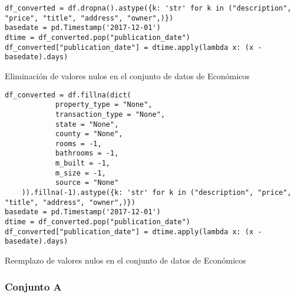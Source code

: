 \begin{listing}[H]
    \begin{verbatim}
df_converted = df.dropna().astype({k: 'str' for k in ("description", "price", "title", "address", "owner",)})
basedate = pd.Timestamp('2017-12-01')
dtime = df_converted.pop("publication_date")
df_converted["publication_date"] = dtime.apply(lambda x: (x - basedate).days)
    \end{verbatim}
\caption{Eliminación de valores nulos en el conjunto de datos de Económicos}
\label{codigo-remove-nan}
\end{listing}

\begin{listing}[H]
    \begin{verbatim}
df_converted = df.fillna(dict(
            property_type = "None",
            transaction_type = "None",
            state = "None",
            county = "None",
            rooms = -1,
            bathrooms = -1,
            m_built = -1,
            m_size = -1,
            source = "None"
    )).fillna(-1).astype({k: 'str' for k in ("description", "price", "title", "address", "owner",)})
basedate = pd.Timestamp('2017-12-01')
dtime = df_converted.pop("publication_date")
df_converted["publication_date"] = dtime.apply(lambda x: (x - basedate).days)
    \end{verbatim}
\caption{Reemplazo de valores nulos en el conjunto de datos de Económicos}
\label{codigo-replace-nan}
\end{listing}

\subsubsection{Conjunto A}
\label{ds-conjunto-a}

